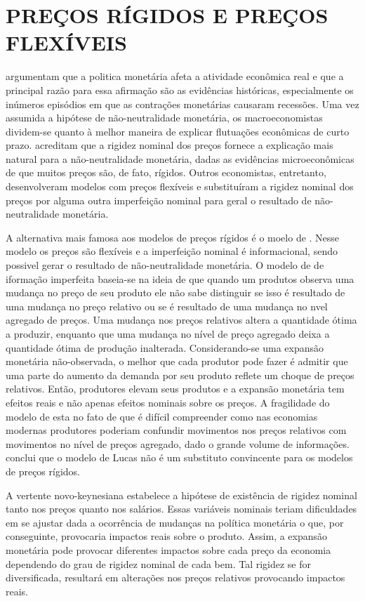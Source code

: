 \documentclass[twoside,a4paper,11pt]{report}
\begin{document}
\section*{PREÇOS RÍGIDOS E PREÇOS FLEXÍVEIS}

\citet{ball1994sticky} argumentam que a politica monetária afeta a atividade econômica real e que a principal razão para essa afirmação são as evidências históricas, especialmente os inúmeros episódios em que as contrações monetárias causaram recessões. Uma vez assumida a hipótese de não-neutralidade monetária, os macroeconomistas dividem-se quanto à melhor maneira de explicar flutuações econômicas de curto prazo. \citet{ball1994sticky} acreditam que a rigidez nominal dos preços fornece a explicação mais natural para a não-neutralidade monetária, dadas as evidências microeconômicas de que muitos preços são, de fato, rígidos. Outros economistas, entretanto, desenvolveram modelos com preços flexíveis e substituíram a rigidez nominal dos preços por alguma outra imperfeição nominal para geral o resultado de não-neutralidade monetária. 

A alternativa mais famosa aos modelos de preços rígidos é o moelo de \citet{lucas1972expectations}. Nesse modelo os preços são flexíveis e a imperfeição nominal é informacional, sendo possivel gerar o resultado de não-neutralidade monetária. O modelo de \citet{lucas1972expectations} de iformação imperfeita baseia-se na ideia de que quando um produtos observa uma mudança no preço de seu produto ele não sabe distinguir se isso é resultado de uma mudança no preço relativo ou se é resultado de uma mudança no nvel agregado de preços. Uma mudança nos preços relativos altera a quantidade ótima a produzir, enquanto que uma mudança no nível de preço agregado deixa a quantidade ótima de produção inalterada. Considerando-se uma expansão monetária não-observada, o melhor que cada produtor pode fazer é admitir que uma parte do aumento da demanda por seu produto reflete um choque de preços relativos. Então, produtores elevam seus produtos e a expansão monetária tem efeitos reais e não apenas efeitos nominais sobre os preços. A fragilidade do modelo de \citet{lucas1972expectations} esta no fato de que é difícil compreender como nas economias modernas produtores poderiam confundir movimentos nos preços relativos com movimentos no nível de preços agregado, dado o grande volume de informações. \citet{ball1994sticky} conclui que o modelo de Lucas não é um substituto convincente para os modelos de preços rígidos.

A vertente novo-keynesiana estabelece a hipótese de existência de rigidez nominal tanto nos preços quanto nos salários. Essas variáveis nominais teriam dificuldades em se ajustar dada a ocorrência de mudanças na política monetária o que, por conseguinte, provocaria impactos reais sobre o produto. Assim, a expansão monetária pode provocar diferentes impactos sobre cada preço da economia dependendo do grau de rigidez nominal de cada bem. Tal rigidez se for diversificada, resultará em alterações nos preços relativos provocando impactos reais.
\end{document}
